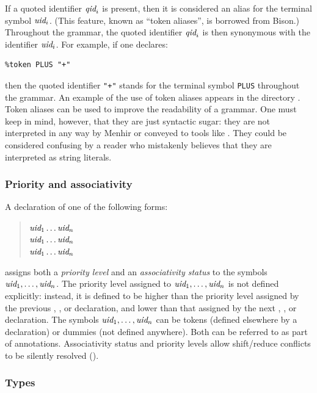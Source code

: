 \documentclass[onecolumn,11pt,nocopyrightspace,preprint]{sigplanconf}
\begin{document}
If a quoted identifier $\textit{qid}_i$ is present, then it is considered an alias
for the terminal symbol $\textit{uid}_i$. (This feature, known as ``token
aliases'', is borrowed from Bison.)
Throughout the grammar, the quoted identifier $\textit{qid}_i$ is then
synonymous with the identifier $\textit{uid}_i$.
%
For example, if one declares:
\begin{verbatim}
%token PLUS "+"
\end{verbatim}
then the quoted identifier \texttt{"+"} stands for the terminal symbol
\texttt{PLUS} throughout the grammar. An example of the use of token aliases
appears in the directory .
%
Token aliases can be used to improve the readability of a grammar. One must
keep in mind, however, that they are just syntactic sugar: they are not
interpreted in any way by Menhir or conveyed to tools like \ocamllex.
%
They could be considered confusing by a reader who mistakenly believes that
they are interpreted as string literals.

\subsubsection{Priority and associativity}
\label{sec:assoc}

A declaration of one of the following forms:
\begin{quote}
\dnonassoc $\textit{uid}_1 \ldots \textit{uid}_n$ \\
\dleft $\textit{uid}_1 \ldots \textit{uid}_n$ \\
\dright $\textit{uid}_1 \ldots \textit{uid}_n$
\end{quote}
assigns both a \emph{priority level} and an \emph{associativity status} to
the symbols $\textit{uid}_1, \ldots, \textit{uid}_n$. The priority level assigned to
$\textit{uid}_1, \ldots, \textit{uid}_n$ is not defined explicitly: instead, it is
defined to be higher than the priority level assigned by the previous
\dnonassoc, \dleft, or \dright declaration, and lower than that assigned by the next
\dnonassoc, \dleft, or \dright declaration. The symbols $\textit{uid}_1, \ldots, \textit{uid}_n$
can be tokens (defined elsewhere by a \dtoken declaration) or dummies (not
defined anywhere). Both can be referred to as part of \dprec annotations.
Associativity status and priority levels allow shift/reduce conflicts to be
silently resolved ().

\subsubsection{Types}
\label{sec:type}
\end{document}
